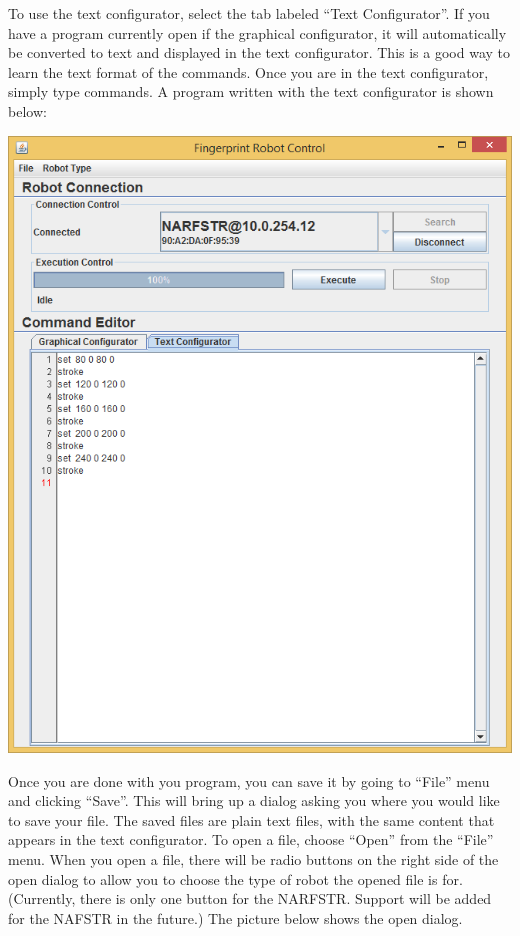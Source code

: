 \documentclass[letterpaper,10pt,english]{sphinxmanual}
\begin{document}
To use the text configurator, select the tab labeled ``Text Configurator''. If you have a program currently open if the graphical configurator, it will automatically be converted to text and displayed in the text configurator. This is a good way to learn the text format of the commands. Once you are in the text configurator, simply type commands. A program written with the text configurator is shown below:

\includegraphics{JavaProgramTextConfigurator.PNG}

Once you are done with you program, you can save it by going to ``File'' menu and clicking ``Save''. This will bring up a dialog asking you where you would like to save your file. The saved files are plain text files, with the same content that appears in the text configurator. To open a file, choose ``Open'' from the ``File'' menu. When you open a file, there will be radio buttons on the right side of the open dialog to allow you to choose the type of robot the opened file is for. (Currently, there is only one button for the NARFSTR. Support will be added for the NAFSTR in the future.) The picture below shows the open dialog.
\end{document}
